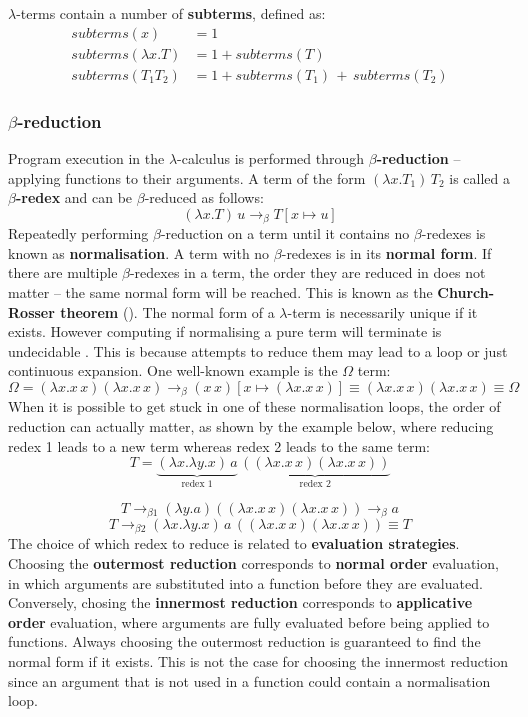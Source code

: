 \documentclass[11pt]{article}
\begin{document}
$\lambda$-terms contain a number of \textbf{subterms}, defined as:
%
\begin{align*}
    subterms(x) &= 1 \\
    subterms(\lambda x. T) &= 1 + subterms(T) \\
    subterms(T_1 T_2) &= 1 + subterms(T_1) \, + \, subterms(T_2)
\end{align*}

\subsubsection{\texorpdfstring{$\beta$}{Beta}-reduction}

Program execution in the $\lambda$-calculus is performed through \textbf{$\beta$-reduction} -- applying functions to their arguments. A term of the form $(\lambda x. T_1) \, T_2$ is called a \textbf{$\beta$-redex} and can be $\beta$-reduced as follows:
%
$$(\lambda x. T) \, u \to_\beta T[x \mapsto u]$$
%
Repeatedly performing $\beta$-reduction on a term until it contains no $\beta$-redexes is known as \textbf{normalisation}. A term with no $\beta$-redexes is in its \textbf{normal form}. If there are multiple $\beta$-redexes in a term, the order they are reduced in does not matter -- the same normal form will be reached. This is known as the \textbf{Church-Rosser theorem} (\cite{churchrosser}). The normal form of a $\lambda$-term is necessarily unique if it exists. However computing if normalising a pure term will terminate is undecidable \cite{church}. This is because attempts to reduce them may lead to a loop or just continuous expansion. One well-known example is the $\Omega$ term:
%
$$ \Omega = (\lambda x. x \, x)(\lambda x. x \, x) \rightarrow_\beta (x \, x)[x \mapsto (\lambda x. x \, x)] \equiv (\lambda x. x \, x)(\lambda x. x \, x) \equiv \Omega $$
%
When it is possible to get stuck in one of these normalisation loops, the order of reduction can actually matter, as shown by the example below, where reducing redex 1 leads to a new term whereas redex 2 leads to the same term:
%
$$ T = \underbrace{(\lambda x. \lambda y. x) \, a}_\text{redex 1} \, \underbrace{((\lambda x. x \, x) (\lambda x. x \, x))}_\text{redex 2} $$

$$ T \rightarrow_{\beta1} (\lambda y. a)((\lambda x. x \, x)(\lambda x. x \, x)) \rightarrow_\beta a$$
%
$$ T \rightarrow_{\beta2} (\lambda x. \lambda y. x) \, a \, ((\lambda x. x \, x)(\lambda x. x \, x)) \equiv T$$
%
The choice of which redex to reduce is related to \textbf{evaluation strategies}. Choosing the \textbf{outermost reduction} corresponds to \textbf{normal order} evaluation, in which arguments are substituted into a function before they are evaluated. Conversely, chosing the \textbf{innermost reduction} corresponds to \textbf{applicative order} evaluation, where arguments are fully evaluated before being applied to functions. Always choosing the outermost reduction is guaranteed to find the normal form if it exists. This is not the case for choosing the innermost reduction since an argument that is not used in a function could contain a normalisation loop.
\end{document}
